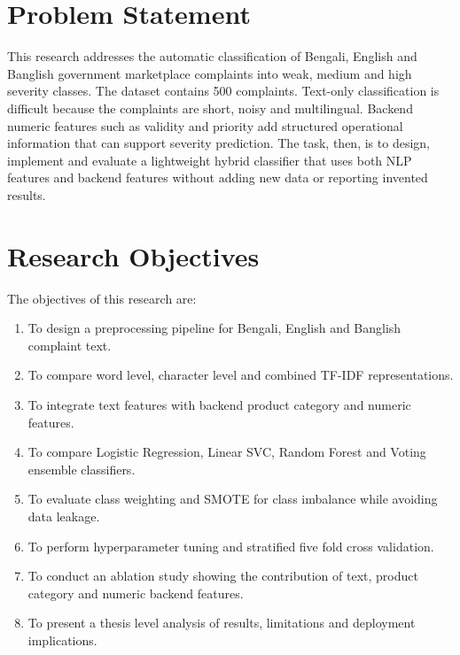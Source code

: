 \documentclass[12pt,a4paper,openany]{book}
\begin{document}
\section{Problem Statement}
This research addresses the automatic classification of Bengali, English and Banglish government marketplace complaints into weak, medium and high severity classes. The dataset contains 500 complaints. Text-only classification is difficult because the complaints are short, noisy and multilingual. Backend numeric features such as validity and priority add structured operational information that can support severity prediction. The task, then, is to design, implement and evaluate a lightweight hybrid classifier that uses both NLP features and backend features without adding new data or reporting invented results.

\section{Research Objectives}
The objectives of this research are:
\begin{enumerate}
  \item To design a preprocessing pipeline for Bengali, English and Banglish complaint text.
  \item To compare word level, character level and combined TF-IDF representations.
  \item To integrate text features with backend product category and numeric features.
  \item To compare Logistic Regression, Linear SVC, Random Forest and Voting ensemble classifiers.
  \item To evaluate class weighting and SMOTE for class imbalance while avoiding data leakage.
  \item To perform hyperparameter tuning and stratified five fold cross validation.
  \item To conduct an ablation study showing the contribution of text, product category and numeric backend features.
  \item To present a thesis level analysis of results, limitations and deployment implications.
\end{enumerate}
\end{document}
